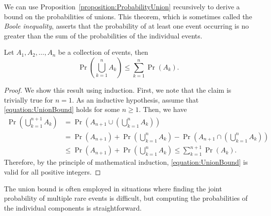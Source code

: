 We can use Proposition~\ref{proposition:ProbabilityUnion} recursively to derive a bound on the probabilities of unions.
This theorem, which is sometimes called the \emph{Boole inequality}, asserts that the probability of at least one event occurring is no greater than the sum of the probabilities of the individual events.

\begin{theorem}
Let $A_1, A_2, \ldots, A_n$ be a collection of events, then
\begin{equation} \label{equation:UnionBound}
\Pr \left( \bigcup_{k=1}^n A_k \right)
\leq \sum_{k=1}^n \Pr (A_k) .
\end{equation}
\end{theorem}
\begin{proof}
We show this result using induction.
First, we note that the claim is trivially true for $n = 1$.
As an inductive hypothesis, assume that \eqref{equation:UnionBound} holds for some $n \geq 1$.
Then, we have
\begin{equation*}
\begin{split}
\Pr \left( \bigcup_{k=1}^{n+1} A_k \right)
&= \Pr \left( A_{n+1} \cup \left( \bigcup_{k=1}^{n} A_k \right) \right) \\
&= \Pr (A_{n+1}) + \Pr \left( \bigcup_{k=1}^{n} A_k \right)
- \Pr \left( A_{n+1} \cap \left( \bigcup_{k=1}^{n} A_k \right) \right) \\
&\leq \Pr (A_{n+1}) + \Pr \left( \bigcup_{k=1}^{n} A_k \right)
\leq \sum_{k = 1}^{n+1} \Pr (A_k) .
\end{split}
\end{equation*}
Therefore, by the principle of mathematical induction, \eqref{equation:UnionBound} is valid for all positive integers.
\end{proof}

The union bound is often employed in situations where finding the joint probability of multiple rare events is difficult, but computing the probabilities of the individual components is straightforward. 

